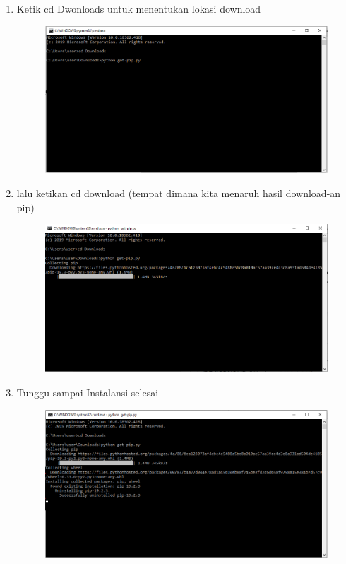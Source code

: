 \begin{enumerate}
    \item Ketik cd Dwonloads untuk menentukan lokasi download

\begin{figure}[!htbp]
    \centering
    \includegraphics[scale=0.4]{figures/8.png}
    \label{visimisi}
\end{figure}

    \item lalu ketikan cd download (tempat dimana kita menaruh hasil download-an pip)


\begin{figure}[!htbp]
    \centering
    \includegraphics[scale=0.4]{figures/9.png}
    \label{visimisi}
\end{figure}

    \item Tunggu sampai Instalansi selesai

\begin{figure}[!htbp]
    \centering
    \includegraphics[scale=0.4]{figures/10.png}
    \label{visimisi}
\end{figure}
\end{enumerate}

